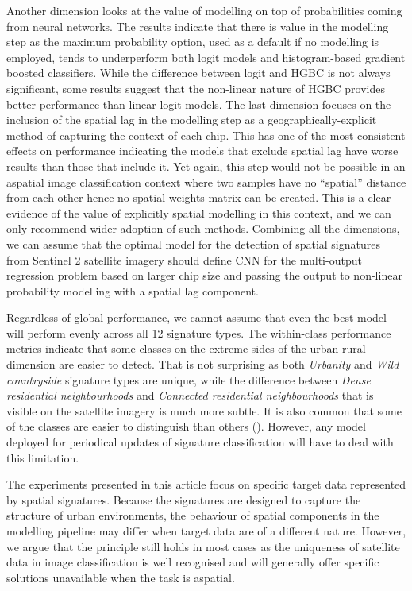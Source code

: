 Another dimension looks at the value of modelling on top of probabilities coming from
neural networks. The results indicate that there is value in the modelling step as the
maximum probability option, used as a default if no modelling is employed, tends to
underperform both logit models and histogram-based gradient
boosted classifiers. While the difference between logit and HGBC is not always
significant, some results suggest that the non-linear nature of HGBC provides better
performance than linear logit models.
The last dimension focuses on the inclusion of the spatial lag in the modelling step as a
geographically-explicit method of capturing the context of each chip. This has one of
the most consistent effects on performance indicating the models that exclude spatial lag have worse
results than those that include it. Yet again, this step would not be possible in an
aspatial image classification context where two samples have no ``spatial'' distance from each
other hence no spatial weights matrix can be created. This is a clear evidence of the value
of explicitly spatial modelling in this context, and we can only recommend wider adoption of such methods.
Combining all the dimensions, we can assume that the optimal model for the detection of spatial
signatures from Sentinel 2 satellite imagery should define CNN for the multi-output
regression problem based on larger chip size and passing the output to non-linear
probability modelling with a spatial lag component.

Regardless of global performance, we cannot assume that even the best model will perform evenly across all 12
signature types. The within-class performance metrics indicate that some classes on the
extreme sides of the urban-rural dimension are easier to detect. That is not surprising
as both \textit{Urbanity} and \textit{Wild countryside} signature types are unique,
while the difference between \textit{Dense residential neighbourhoods} and
\textit{Connected residential neighbourhoods} that is visible on the satellite imagery
is much more subtle. It is also common that some of the classes are easier to
distinguish than others (\cite{zanaga_daniele_2021_5571936, karra2021global}). However,
any model deployed for periodical updates of signature classification will have to deal
with this limitation.

The experiments presented in this article focus on specific target data represented by
spatial signatures. Because the signatures are designed to capture the structure of urban
environments, the behaviour of spatial components in the modelling pipeline may differ
when target data are of a different nature. However, we argue that the
principle still holds in most cases as the uniqueness of satellite data in image
classification is well recognised and will generally offer specific solutions unavailable when the task is aspatial.

